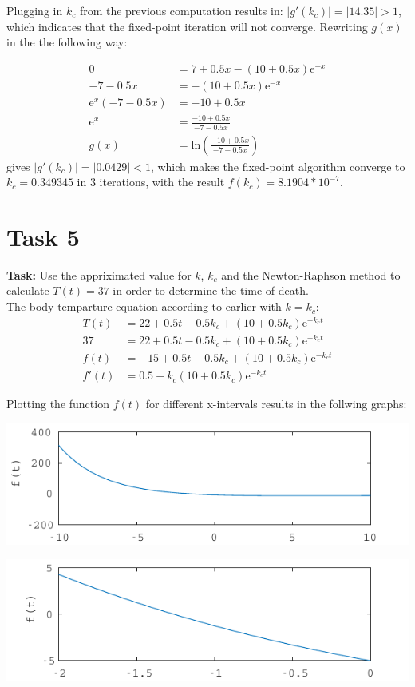 \documentclass{article}
\begin{document}
  \noindent
  Plugging in $k_c$ from the previous computation results in:  $|g'(k_c)| = |14.35|
  > 1 $, which indicates that the fixed-point iteration will not converge.
  Rewriting $g(x)$ in the the following way:

  \noindent
  \begin{align*}
    0  &= 7 + 0.5x - (10 + 0.5x)\mathrm{e}^{-x} \\
    -7 -0.5x  &= -(10 + 0.5x)\mathrm{e}^{-x} \\
    \mathrm{e}^{x}(-7 -0.5x)  &= -10 + 0.5x \\
    \mathrm{e}^{x}  &= \frac{-10 + 0.5x}{-7-0.5x} \\
    g(x) &= \mathrm{ln}(\frac{-10 + 0.5x}{-7-0.5x})
  \end{align*}
  \noindent
  gives $|g'(k_c)| = |0.0429| < 1 $, which makes the fixed-point algorithm converge to
  $ k_c = 0.349345 $ in 3 iterations, with the result $f(k_c) = 8.1904*10^{-7}$.

\section*{Task 5}

  \textbf{Task:}
  Use the appriximated value for $k$, $k_c$ and the Newton-Raphson method to
  calculate $T(t) = 37$ in order to determine the time of death. \\

  \noindent
  The body-temparture equation according to earlier with $k = k_c$:
  \begin{align*}
    T(t) &= 22 + 0.5t - 0.5k_c + (10 + 0.5k_c)\mathrm{e}^{-k_ct} \\
    37 &= 22 + 0.5t - 0.5k_c + (10 + 0.5k_c)\mathrm{e}^{-k_ct} \\
    f(t) &= -15 + 0.5t - 0.5k_c + (10 + 0.5k_c)\mathrm{e}^{-k_ct} \\
    f'(t) &=  0.5 -k_c(10 + 0.5k_c)\mathrm{e}^{-k_ct}
  \end{align*}

  \noindent
  Plotting the function $f(t)$ for different x-intervals results in the
  follwing graphs:

  \begin{center}
    \includegraphics{figs/t5_check.pdf}
  \end{center}

  \begin{center}
    \includegraphics{figs/t5_check_2.pdf}
  \end{center}
\end{document}
